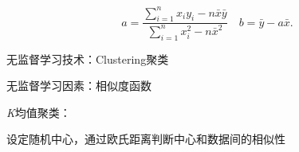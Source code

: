 \[
    a= \frac{\sum_{i=1}^{n} x_{i}y_{i}-n\bar{x}\bar{y}}{\sum_{i=1}^{n} x_{i}^2-n\bar{x}^2}\quad b=\bar{y}-a\bar{x}
.\]
\begin{notation}
    无监督学习技术：Clustering聚类

    无监督学习因素：相似度函数
\end{notation}
\begin{notation}
    \textit{K}均值聚类：

    设定随机中心，通过欧氏距离判断中心和数据间的相似性
\end{notation}

